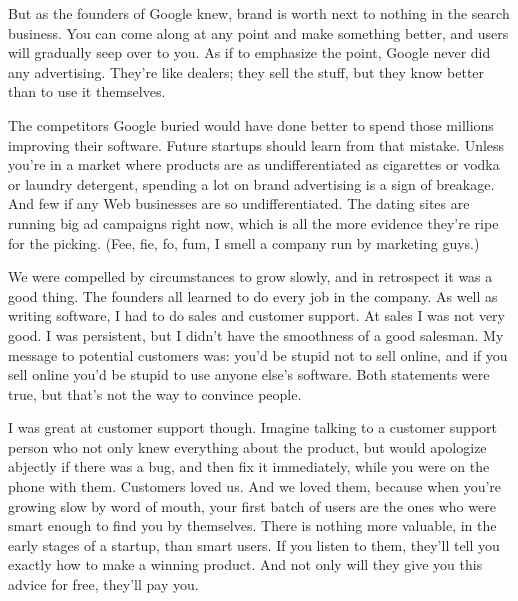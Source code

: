 But as the founders of Google knew,
                    brand is worth next to nothing in the search business. You
                    can come along at any point and make something better, and
                    users will gradually seep over to you. As if to emphasize
                    the point, Google never did any advertising. They're like
                    dealers; they sell the stuff, but they know better than to
                    use it themselves.

The competitors Google buried
                    would have done better to spend those millions improving
                    their software. Future startups should learn from that
                    mistake. Unless you're in a market where products are as
                    undifferentiated as cigarettes or vodka or laundry
                    detergent, spending a lot on brand advertising is a sign of
                    breakage. And few if any Web businesses are so
                    undifferentiated. The dating sites are running big ad
                    campaigns right now, which is all the more evidence they're
                    ripe for the picking. (Fee, fie, fo, fum, I smell a company
                    run by marketing guys.)

We were compelled by
                    circumstances to grow slowly, and in retrospect it was a
                    good thing. The founders all learned to do every job in the
                    company. As well as writing software, I had to do sales and
                    customer support. At sales I was not very good. I was
                    persistent, but I didn't have the smoothness of a good
                    salesman. My message to potential customers was: you'd be
                    stupid not to sell online, and if you sell online you'd be
                    stupid to use anyone else's software. Both statements were
                    true, but that's not the way to convince people.

I
                    was great at customer support though. Imagine talking to a
                    customer support person who not only knew everything about
                    the product, but would apologize abjectly if there was a
                    bug, and then fix it immediately, while you were on the
                    phone with them. Customers loved us. And we loved them,
                    because when you're growing slow by word of mouth, your
                    first batch of users are the ones who were smart enough to
                    find you by themselves. There is nothing more valuable, in
                    the early stages of a startup, than smart users. If you
                    listen to them, they'll tell you exactly how to make a
                    winning product. And not only will they give you this advice
                    for free, they'll pay you.

